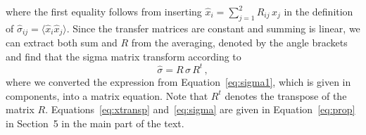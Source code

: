 \documentclass{article}
\begin{document}
where the first equality follows from inserting $\hat x_i=\sum_{j=1}^2 R_{ij}\, x_j$ in the
definition of $\hat\sigma_{ij}= \langle \hat x_i \hat x_j \rangle$. Since the transfer 
matrices are constant and summing is linear, we can extract both sum and $R$ from the
averaging, denoted by the angle brackets and find that the sigma matrix transform 
according to
\begin{equation}\label{eq:sigma}
\hat\sigma = R\, \sigma\, R^t\, ,
\end{equation}
where we converted the expression from Equation~\ref{eq:sigma1}, which is given in 
components, into a matrix equation. Note that $R^t$ denotes the transpose of the matrix 
$R.$ Equations~\ref{eq:xtransp} and~\ref{eq:sigma} are given in Equation~\ref{eq:prop}
in Section~5 in the main part of the text.
\end{document}
